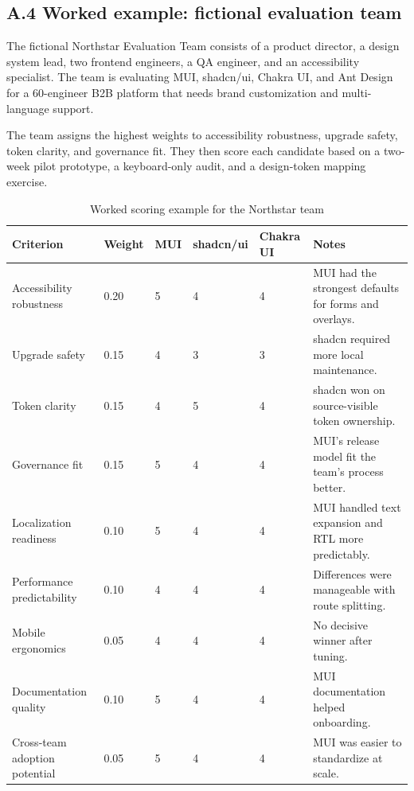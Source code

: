 \subsection*{A.4 Worked example: fictional evaluation team}
The fictional Northstar Evaluation Team consists of a product director, a design system lead, two frontend engineers, a QA engineer, and an accessibility specialist. The team is evaluating MUI, shadcn/ui, Chakra UI, and Ant Design for a 60-engineer B2B platform that needs brand customization and multi-language support.

The team assigns the highest weights to accessibility robustness, upgrade safety, token clarity, and governance fit. They then score each candidate based on a two-week pilot prototype, a keyboard-only audit, and a design-token mapping exercise.

\begin{table}[htbp]
  \centering
  \caption{Worked scoring example for the Northstar team}
  \begin{tabularx}{\textwidth}{@{}p{}p{}p{}p{}p{}Y@{}}
    \toprule
    \textbf{Criterion} & \textbf{Weight} & \textbf{MUI} & \textbf{shadcn/ui} & \textbf{Chakra UI} & \textbf{Notes} \\
    \midrule
    Accessibility robustness & 0.20 & 5 & 4 & 4 & MUI had the strongest defaults for forms and overlays. \\
    Upgrade safety & 0.15 & 4 & 3 & 3 & shadcn required more local maintenance. \\
    Token clarity & 0.15 & 4 & 5 & 4 & shadcn won on source-visible token ownership. \\
    Governance fit & 0.15 & 5 & 4 & 4 & MUI's release model fit the team's process better. \\
    Localization readiness & 0.10 & 5 & 4 & 4 & MUI handled text expansion and RTL more predictably. \\
    Performance predictability & 0.10 & 4 & 4 & 4 & Differences were manageable with route splitting. \\
    Mobile ergonomics & 0.05 & 4 & 4 & 4 & No decisive winner after tuning. \\
    Documentation quality & 0.10 & 5 & 4 & 4 & MUI documentation helped onboarding. \\
    Cross-team adoption potential & 0.05 & 5 & 4 & 4 & MUI was easier to standardize at scale. \\
    \bottomrule
  \end{tabularx}
\end{table}

